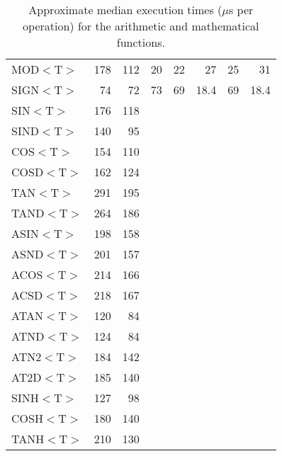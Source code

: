 \begin{table}[h]
\begin{center}
{\begin{tabular}{|l|r|r|r|r|r|r|r|}
MOD$<$T$>$ &  178 &  112 &   20 &   22 &   27 &   25 &   31 \\
SIGN$<$T$>$ &   74 &   72 &   73 &   69 & 18.4 &   69 & 18.4 \\
SIN$<$T$>$ &  176 &  118 &      &      &      &      &      \\
SIND$<$T$>$ &  140 &   95 &      &      &      &      &      \\
COS$<$T$>$ &  154 &  110 &      &      &      &      &      \\
COSD$<$T$>$ &  162 &  124 &      &      &      &      &      \\
TAN$<$T$>$ &  291 &  195 &      &      &      &      &      \\
TAND$<$T$>$ &  264 &  186 &      &      &      &      &      \\
ASIN$<$T$>$ &  198 &  158 &      &      &      &      &      \\
ASND$<$T$>$ &  201 &  157 &      &      &      &      &      \\
ACOS$<$T$>$ &  214 &  166 &      &      &      &      &      \\
ACSD$<$T$>$ &  218 &  167 &      &      &      &      &      \\
ATAN$<$T$>$ &  120 &   84 &      &      &      &      &      \\
ATND$<$T$>$ &  124 &   84 &      &      &      &      &      \\
ATN2$<$T$>$ &  184 &  142 &      &      &      &      &      \\
AT2D$<$T$>$ &  185 &  140 &      &      &      &      &      \\
SINH$<$T$>$ &  127 &   98 &      &      &      &      &      \\
COSH$<$T$>$ &  180 &  140 &      &      &      &      &      \\
TANH$<$T$>$ &  210 &  130 &      &      &      &      &      \\
\hline
\end{tabular}
}
\caption{Approximate median execution times ($\mu$s per operation) for the
 arithmetic and mathematical functions.}
\label{table:numstats}
\end{center}
\end{table}

\newpage


